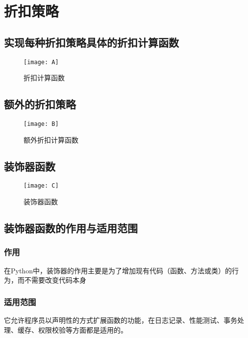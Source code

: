 \documentclass[10pt]{article}
\begin{document}
	\section{折扣策略}
	\subsection{实现每种折扣策略具体的折扣计算函数}
	\begin{figure}[H]
		\centering
		\texttt{[image: A]}
		\caption{折扣计算函数}
	\end{figure}
	\subsection{额外的折扣策略}
	\begin{figure}[H]
		\centering
		\texttt{[image: B]}
		\caption{额外折扣计算函数}
	\end{figure}
	\subsection{装饰器函数}
	\begin{figure}[H]
		\centering
		\texttt{[image: C]}
		\caption{装饰器函数}
	\end{figure}
	\subsection{装饰器函数的作用与适用范围}
	\subsubsection{作用}在Python中，装饰器的作用主要是为了增加现有代码（函数、方法或类）的行为，而不需要改变代码本身
	\subsubsection{适用范围}它允许程序员以声明性的方式扩展函数的功能，在日志记录、性能测试、事务处理、缓存、权限校验等方面都是适用的。
\end{document}
